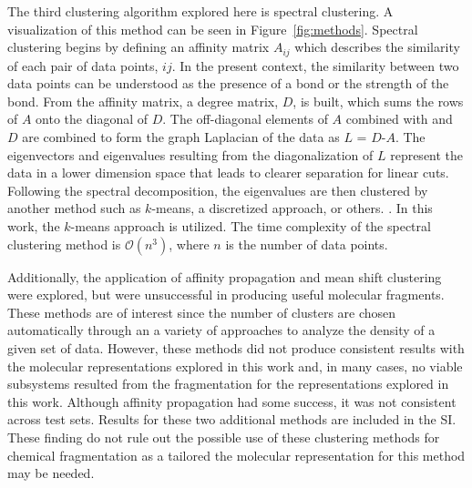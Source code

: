 The third clustering algorithm explored here is spectral clustering.\autocite{1238361,868688,10.1093/imaiai/iay008} 
A visualization of this method can be seen in Figure~\ref{fig:methods}.
Spectral clustering begins by defining an affinity matrix $A_{ij}$ which describes the similarity of each pair of data points,  $ij$.
In the present context, the similarity between two data points can be understood as the presence of a bond or the strength of the bond.
From the affinity matrix, a degree matrix, $D$, is built, which sums the rows of $A$ onto the diagonal of $D$. 
The off-diagonal elements of $A$ combined with and $D$ are combined to form the graph Laplacian of the data as $L$ = $D$-$A$. 
The eigenvectors and eigenvalues resulting from the diagonalization of $L$ represent the data in a lower dimension space that  leads to clearer separation for linear cuts.
Following the spectral decomposition, the eigenvalues are then clustered by another method such as $k$-means, a discretized approach, or others. \autocite{10.5555/2980539.2980649,868688,1238361}. 
In this work, the $k$-means approach is utilized.
The time complexity of the spectral clustering method is $\mathcal{O}(n^3)$, where $n$ is the number of data points.
%

Additionally, the application of affinity propagation and mean shift clustering were explored, but were unsuccessful in producing useful molecular fragments. These methods are of interest since the number of clusters are chosen automatically through an a variety of approaches to analyze the density of a given set of data. However, these methods did not produce consistent results with the molecular representations explored in this work and, in many cases, no viable subsystems resulted from the fragmentation for the representations explored in this work. Although affinity propagation had some success, it was not consistent across test sets. Results for these two additional methods are included in the SI. These finding do not rule out the possible use of these clustering methods for chemical fragmentation as a tailored the molecular representation for this method may be needed.

